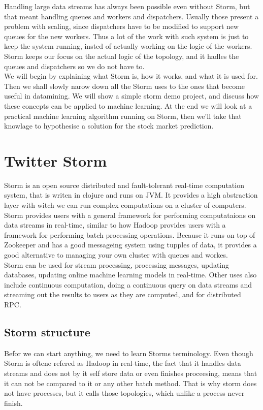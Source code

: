\documentclass[journal]{IEEEtran/IEEEtran}
\begin{document}
Handling large data streams has always been possible even without Storm, but that meant handling queues and workers and dispatchers. Usually those present a problem with scaling, since dispatchers have to be modified to support new queues for the new workers. Thus a lot of the work with such system is just to keep the system running, insted of actually working on the logic of the workers. Storm keeps our focus on the actual logic of the topology, and it hadles the queues and dispatchers so we do not have to. \\

We will begin by explaining what Storm is, how it works, and what it is used for. Then we shall slowly narow down all the Storm uses to the ones that become useful in datamining. We will show a simple storm demo project, and discuss how these concepts can be applied to machine learning. At the end we will look at a practical machine learning algorithm running on Storm, then we'll take that knowlage to hypothesise a solution for the stock market prediction.


\section{Twitter Storm}
Storm is an open source distributed and fault-tolerant real-time computation system, that is writen in clojure and runs on JVM. It provides a high abstraction layer with witch we can run complex computations on a cluster of computers. Storm provides users with a general framework for performing computataions on data streams in real-time, similar to how Hadoop provides users with a framework for performing batch processing operations. Because it runs on top of Zookeeper and has a good messageing system using tupples of data, it provides a good alternative to managing your own cluster with queues and workes. \\

Storm can be used for stream processing, processing messages, updating databases, updating online machine learning models in real-time. Other uses also include continuous computation, doing a continuous query on data streams and streaming out the results to users as they are computed, and for distributed RPC. 


\subsection{Storm structure}
Befor we can start anything, we need to learn Storms terminology. Even though Storm is oftene refered as Hadoop in real-time, the fact that it handles data streams and does not by it self store data or even finishes proceesing, means that it can not be compared to it or any other batch method. That is why storm does not have processes, but it calls those topologies, which unlike a process never finish.\\
\end{document}
